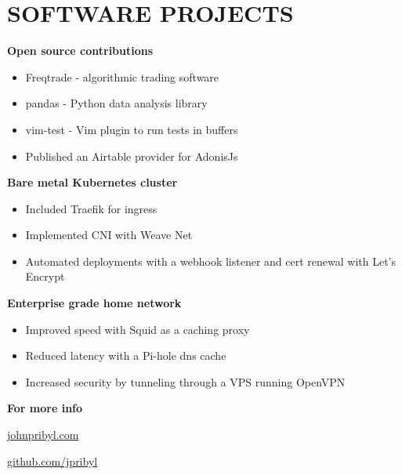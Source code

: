 \documentclass[12pt]{resume}
\begin{document}
    \begin{minipage}[t]{0.369\textwidth}
        {\section* {SOFTWARE PROJECTS}}
        \vspace{.5em}

        {\bf Open source contributions}
        \vspace{.7em}
        \begin{itemize}
            \setlength\itemsep{-.2em}
            \item {Freqtrade - algorithmic trading software}
            \item {pandas - Python data analysis library}
            \item {vim-test - Vim plugin to run tests in buffers}
            \item {Published an Airtable provider for AdonisJs}
        \end{itemize}

        {\bf Bare metal Kubernetes cluster}
        \begin{itemize}
            \setlength\itemsep{-.2em}
            \item {Included Traefik for ingress}
            \item {Implemented CNI with Weave Net}
            \item {Automated deployments with a webhook listener and cert renewal with Let's Encrypt}
        \end{itemize}


        {\bf Enterprise grade home network}
        \begin{itemize}
            \setlength\itemsep{-.2em}
            \item {Improved speed with Squid as a caching proxy}
            \item {Reduced latency with a Pi-hole dns cache}
            \item {Increased security by tunneling through a VPS running OpenVPN}
        \end{itemize}

        {\bf For more info}
        \vspace{.7em}
        {\par \textcolor{lavender}{\faGlobe\hspace{.5em}\underline{\href{http://www.johnpribyl.com}{johnpribyl.com}}}}
        {\par \textcolor{lavender}{\faGithub\hspace{.5em}\underline{\href{http://www.github.com/jpribyl}{github.com/jpribyl}}}}


\end{minipage}
\end{document}
